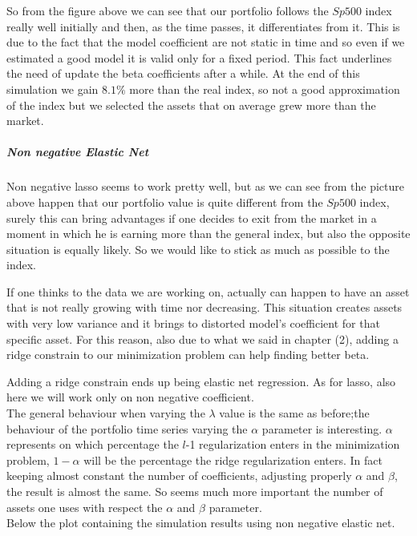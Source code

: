 \documentclass{article}%
\begin{document}
So from the figure above we can see that our portfolio follows the $Sp500$ index really well initially and then, as the time passes, it differentiates from it. This is due to the fact that the model coefficient are not static in time and so even if we estimated a good model it is valid only for a fixed period. This fact underlines the need of update the beta coefficients after a while. At the end of this simulation we gain $8.1\%$ more than the real index, so not a good approximation of the index but we selected the assets that on average grew more than the market.

\subparagraph{Non negative Elastic Net}
Non negative lasso seems to work pretty well, but as we can see from the picture above happen that our portfolio value is quite different from the $Sp500$ index, surely this can bring advantages if one decides to exit from the market in a moment in which he is earning more than the general index, but also the opposite situation is equally likely. So we would like to stick as much as possible to the index.

If one thinks to the data we are working on, actually can happen to have an asset that is not really growing with time nor decreasing. This situation creates assets with very low variance and it brings to distorted model's coefficient for that specific asset. For this reason, also due to what we said in chapter (2), adding a ridge constrain to our minimization problem can help finding better beta.

Adding a ridge constrain ends up being elastic net regression. As for lasso, also here we will work only on non negative coefficient.
\\

The general behaviour when varying the $\lambda$ value is the same as before;the behaviour of the portfolio time series varying the $\alpha$ parameter is interesting. $\alpha$ represents on which percentage the $l$-1 regularization enters in the minimization problem, $1-\alpha$ will be the percentage the ridge regularization enters. In fact keeping almost constant the number of coefficients, adjusting properly $\alpha$ and $\beta$, the result is almost the same. So seems much more important the number of assets one uses with respect the $\alpha$ and $\beta$ parameter.
\\

Below the plot containing the simulation results using non negative elastic net.
\\
\end{document}
